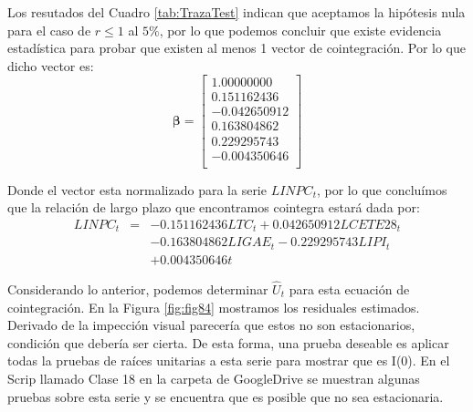 \documentclass[
]{book}
\begin{document}
Los resutados del Cuadro \ref{tab:TrazaTest} indican que aceptamos la hipótesis nula para el caso de \(r \leq 1\) al \(5\%\), por lo que podemos concluir que existe evidencia estadística para probar que existen al menos 1 vector de cointegración. Por lo que dicho vector es:
\begin{equation}
    \boldsymbol{\beta} = \left[ 
    \begin{matrix}
    1.00000000 \\
    0.151162436 \\
    -0.042650912 \\
    0.163804862 \\
    0.229295743 \\
    -0.004350646 \\
    \end{matrix} \right]
\end{equation}

Donde el vector esta normalizado para la serie \(LINPC_t\), por lo que concluímos que la relación de largo plazo que encontramos cointegra estará dada por:
\begin{eqnarray*}
    LINPC_t & = & -0.151162436 LTC_t + 0.042650912 LCETE28_t \\
    &  & - 0.163804862 LIGAE_t - 0.229295743 LIPI_t \\
    &  & + 0.004350646 t
\end{eqnarray*}

Considerando lo anterior, podemos determinar \(\hat{U}_t\) para esta ecuación de cointegración. En la Figura \ref{fig:fig84} mostramos los residuales estimados. Derivado de la impección visual parecería que estos no son estacionarios, condición que debería ser cierta. De esta forma, una prueba deseable es aplicar todas la pruebas de raíces unitarias a esta serie para mostrar que es I(0). En el Scrip llamado Clase 18 en la carpeta de GoogleDrive se muestran algunas pruebas sobre esta serie y se encuentra que es posible que no sea estacionaria.
\end{document}
